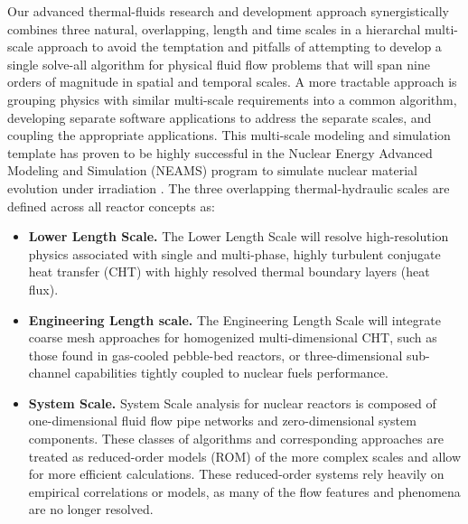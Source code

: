 Our advanced thermal-fluids research and development approach synergistically combines three natural, overlapping, length and time scales in a hierarchal multi-scale approach to avoid the temptation and
pitfalls of attempting to develop a single solve-all algorithm for physical fluid flow problems that will span nine orders of magnitude in spatial and temporal scales. A more tractable approach is grouping physics with similar multi-scale requirements into a common algorithm, developing separate software applications to address the separate scales, and coupling the appropriate applications. This multi-scale modeling and simulation template has proven to be highly successful in the Nuclear Energy Advanced Modeling and Simulation (NEAMS) program to simulate nuclear material evolution under irradiation \cite{tonks2013multiscale}. The three overlapping thermal-hydraulic scales are defined across all reactor concepts as:
\begin{itemize}
    \item \textbf{Lower Length Scale.} The Lower Length Scale will resolve high-resolution physics
    associated with single and multi-phase, highly turbulent conjugate heat transfer (CHT) with highly
    resolved thermal boundary layers (heat flux).
    \item \textbf{Engineering Length scale.} The Engineering Length Scale will integrate coarse mesh approaches
    for homogenized multi-dimensional CHT, such as those found in gas-cooled pebble-bed reactors, or three-dimensional sub-channel capabilities tightly coupled to nuclear fuels performance.
    \item \textbf{System Scale.} System Scale analysis for nuclear reactors is composed of one-dimensional fluid flow
    pipe networks and zero-dimensional system components. These classes of algorithms and corresponding approaches are treated as reduced-order models (ROM) of the more complex scales and allow for more efficient calculations. These reduced-order systems rely heavily on empirical correlations or models, as many of the flow features and phenomena are no longer resolved.
\end{itemize}

